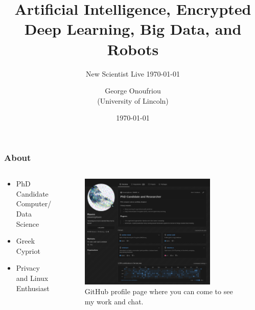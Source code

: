 \documentclass[aspectratio=169]{beamer}
\title{Artificial Intelligence, Encrypted Deep Learning, Big Data, and Robots}
\subtitle{New Scientist Live \today}
\author{George Onoufriou\\(University of Lincoln)}
\date{\today}
\begin{document}

  \frame{\titlepage}

  \begin{frame}
    \frametitle{About}
    \begin{columns}
      \begin{column}{0.5\textwidth}
        \begin{itemize}
          \item PhD Candidate Computer/ Data Science
          \item Greek Cypriot
          \item Privacy and Linux Enthusiast
        \end{itemize}
      \end{column}
      \begin{column}{0.5\textwidth}
        \begin{figure}[th!]
          \centering
          \includegraphics[width=0.8\textwidth]{gh.png}
          \caption{GitHub profile page where you can come to see my work and chat.}
          \label{fig:gh}
        \end{figure}
      \end{column}
    \end{columns}
  \end{frame}
\end{document}
